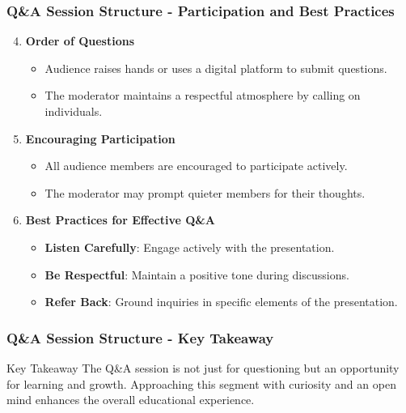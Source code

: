 \documentclass[aspectratio=169]{beamer}
\begin{document}
\begin{frame}[fragile]
    \frametitle{Q\&A Session Structure - Participation and Best Practices}
    \begin{enumerate}
        \setcounter{enumi}{3}
        \item \textbf{Order of Questions}
            \begin{itemize}
                \item Audience raises hands or uses a digital platform to submit questions.
                \item The moderator maintains a respectful atmosphere by calling on individuals.
            \end{itemize}
        
        \item \textbf{Encouraging Participation}
            \begin{itemize}
                \item All audience members are encouraged to participate actively.
                \item The moderator may prompt quieter members for their thoughts.
            \end{itemize}
        
        \item \textbf{Best Practices for Effective Q\&A}
            \begin{itemize}
                \item \textbf{Listen Carefully}: Engage actively with the presentation.
                \item \textbf{Be Respectful}: Maintain a positive tone during discussions.
                \item \textbf{Refer Back}: Ground inquiries in specific elements of the presentation.
            \end{itemize}
    \end{enumerate}
\end{frame}

\begin{frame}[fragile]
    \frametitle{Q\&A Session Structure - Key Takeaway}
    \begin{block}{Key Takeaway}
        The Q\&A session is not just for questioning but an opportunity for learning and growth. Approaching this segment with curiosity and an open mind enhances the overall educational experience.
    \end{block}
\end{frame}
\end{document}
